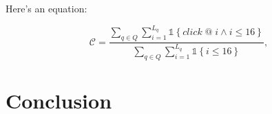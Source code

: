 \documentclass{article}
\begin{document}
Here's an equation:

\begin{equation}
    \mathscr{C} = \frac{\sum_{q \in Q}\sum_{i=1}^{L_q}\mathds{1}\left\{click\; @\; i \wedge i \leq 16\right\}}{\sum_{q \in Q}\sum_{i=1}^{L_q}\mathds{1}\left\{i \leq 16\right\}},
\end{equation}

\section{Conclusion}\label{sec:conclusion}

\nocite{*}
{}

\end{document}
